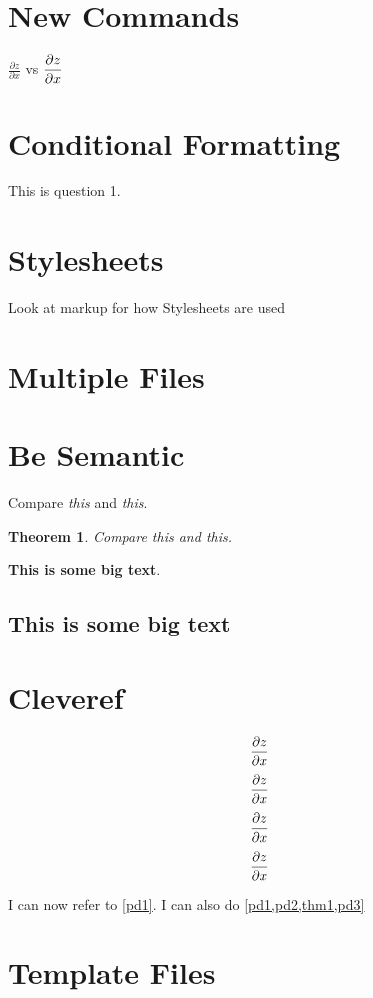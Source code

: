 \documentclass{article}
\newtheorem{theorem}{Theorem}
\begin{document}
\section{New Commands}
$\displaystyle\frac{\partial z}{\partial x}$ vs $\displaystyle\frac{\partial z}{\partial x}$

\section{Conditional Formatting}
This is question 1. 
\section{Stylesheets}
Look at markup for how Stylesheets are used
\section{Multiple Files}


\section{Be Semantic}

Compare \textit{this} and \emph{this}.

\begin{theorem}
    \label{thm1}
    Compare \textit{this} and \emph{this}.
\end{theorem}

\large{\bf This is some big text}.

\subsection{This is some big text}

\section{Cleveref}
\begin{equation}
    \label{pd1}
    \displaystyle\frac{\partial z}{\partial x}
\end{equation}
\begin{equation}
    \label{pd2}
    \displaystyle\frac{\partial z}{\partial x}
\end{equation}
\begin{equation}
    \label{pd3}
    \displaystyle\frac{\partial z}{\partial x}
\end{equation}
\begin{equation}
    \label{pd4}
    \displaystyle\frac{\partial z}{\partial x}
\end{equation}

I can now refer to \cref{pd1}. I can also do \cref{pd1,pd2,thm1,pd3}

\section{Template Files}
\end{document}
